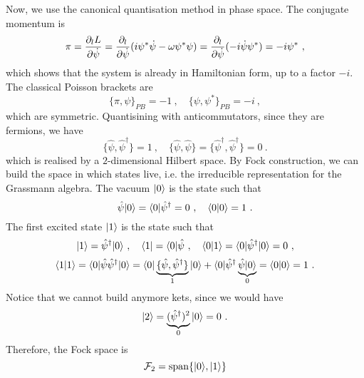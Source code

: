     Now, we use the canonical quantisation method in phase space. The conjugate momentum is 
    \begin{equation*}
        \pi = \frac{\partial_l L}{\partial\dot \psi} = \frac{\partial_l}{\partial\dot \psi} (i \psi^* \dot \psi - \omega \psi^* \psi) = \frac{\partial_l}{\partial\dot \psi} ( - i \dot \psi \psi^*) = - i \psi^* ~,
    \end{equation*}
    which shows that the system is already in Hamiltonian form, up to a factor $-i$. The classical Poisson brackets are 
    \begin{equation*}
        \{\pi, \psi\}_{PB} = - 1 ~, \quad \{\psi, \psi^*\}_{PB} = - i ~,
    \end{equation*}
    which are symmetric. Quantisining with anticommutators, since they are fermions, we have  
    \begin{equation*}\label{f:antic}
        \{\hat \psi, \hat \psi^\dagger\} = 1 ~, \quad \{\hat \psi, \hat \psi\} = \{\hat \psi^\dagger, \hat \psi^\dagger\} = 0 ~.
    \end{equation*}
    which is realised by a $2$-dimensional Hilbert space. By Fock construction, we can build the space in which states live, i.e. the irreducible representation for the Grassmann algebra. The vacuum $\vert0\rangle$ is the state such that 
    \begin{equation*}
        \hat \psi \vert0\rangle = \langle0\vert \hat \psi^\dagger = 0 ~, \quad \langle0\vert0\rangle = 1 ~.
    \end{equation*}
    The first excited state $\vert1\rangle$ is the state such that
    \begin{equation*}
        \vert1\rangle = \hat \psi^\dagger \vert0\rangle ~, \quad \langle1\vert = \langle0\vert \hat \psi ~, \quad \langle0\vert1\rangle = \langle0\vert \hat \psi^\dagger \vert0\rangle = 0 ~,
    \end{equation*}
    \begin{equation*}
        \langle1\vert1\rangle = \langle0\vert \hat \psi \hat \psi^\dagger \vert0\rangle = \langle0\vert \underbrace{\{\hat \psi, \hat \psi^\dagger\}}_1 \vert0\rangle + \langle0\vert \hat \psi^\dagger \underbrace{\hat \psi \vert0\rangle}_0 = \langle0\vert0\rangle = 1 ~.
    \end{equation*}
    Notice that we cannot build anymore kets, since we would have 
    \begin{equation*}
        \vert2\rangle = \underbrace{(\hat \psi^\dagger)^2}_0 \vert0\rangle = 0 ~.
    \end{equation*}
    Therefore, the Fock space is 
    \begin{equation*}
        \mathcal F_2 = \operatorname{span} \{\vert0\rangle, \vert1\rangle \}
    \end{equation*}
